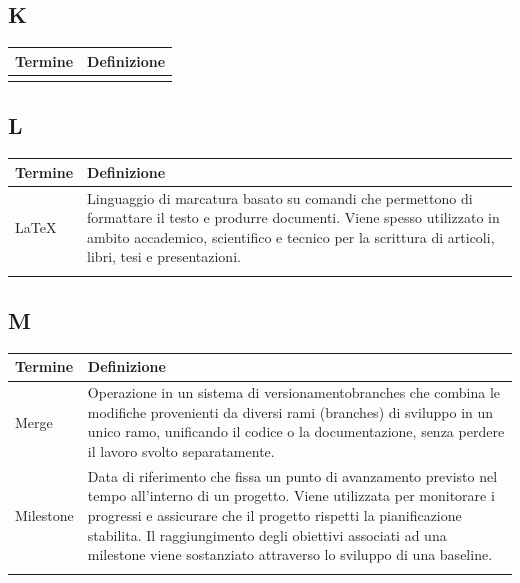 \documentclass[10pt]{article}
\begin{document}
\subsection{K} %
\begin{tabularx}{\textwidth}{|>{\centering\arraybackslash}l|X|}
\hline
\rowcolor[gray]{0.8}
\textbf{Termine} & \textbf{Definizione}\\
\hline
 & \\
\hline
\end{tabularx}

\subsection{L} %
\begin{tabularx}{\textwidth}{|>{\centering\arraybackslash}l|X|}
\hline
\rowcolor[gray]{0.8}
\textbf{Termine} & \textbf{Definizione}\\
\hline
LaTeX & Linguaggio di marcatura basato su comandi che permettono di formattare il testo e produrre documenti. Viene spesso utilizzato in ambito accademico, scientifico e tecnico per la scrittura di articoli, libri, tesi e presentazioni.\\
\hline
 & \\
\hline
\end{tabularx}
 
\subsection{M} %
\begin{tabularx}{\textwidth}{|>{\centering\arraybackslash}l|X|}
\hline
\rowcolor[gray]{0.8}
\textbf{Termine} & \textbf{Definizione}\\
\hline
Merge & Operazione in un sistema di versionamentobranches che combina le modifiche provenienti da diversi rami (branches) di sviluppo in un unico ramo, unificando il codice o la documentazione, senza perdere il lavoro svolto separatamente.\\
\hline
Milestone & Data di riferimento che fissa un punto di avanzamento previsto nel tempo all'interno di un progetto. Viene utilizzata per monitorare i progressi e assicurare che il progetto rispetti la pianificazione stabilita. Il raggiungimento degli obiettivi associati ad una milestone viene sostanziato attraverso lo sviluppo di una baseline.\\
\hline
 & \\
\hline
\end{tabularx}
\end{document}
